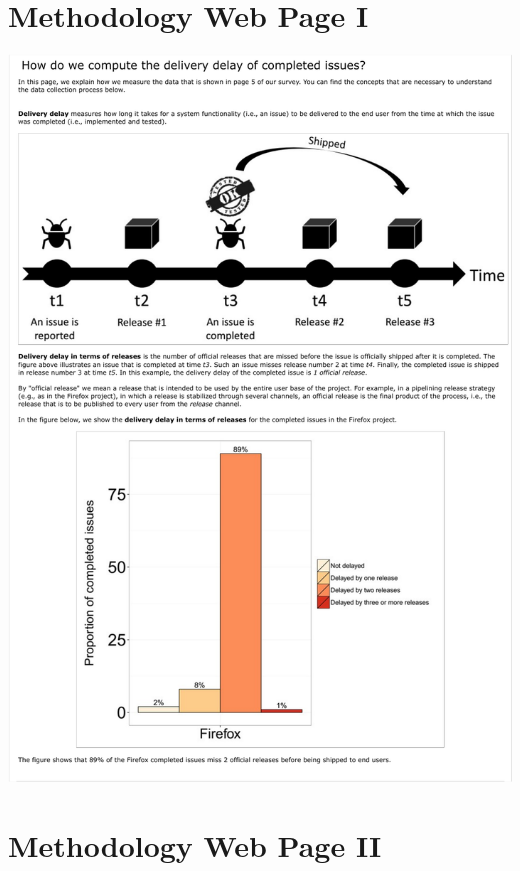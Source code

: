 \chapter{Methodology Web Page I}\label{methodology:i}

\includegraphics[width=\textwidth]{chapters/chapter5/appendix/GeneralIntegrationDelay.pdf}

\chapter{Methodology Web Page II}\label{methodology:ii}

